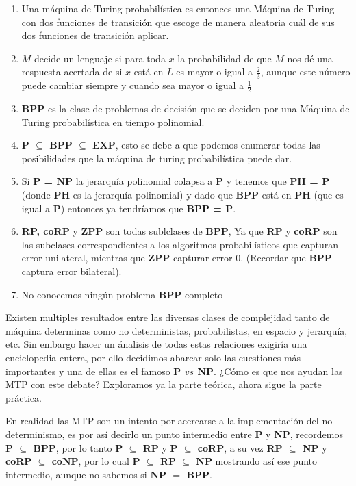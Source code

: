 \documentclass[12pt,letterpaper]{article}
\begin{document}
\begin{enumerate}
 
\item Una máquina de Turing probabilística es entonces una Máquina de Turing con dos funciones de transición que escoge de manera aleatoria cuál de sus dos funciones de transición aplicar.

\item $M$ decide un lenguaje si para toda $x$ la probabilidad de que $M$ nos dé una respuesta acertada de si $x$ está en $L$ es mayor o igual a $\frac{2}{3}$, aunque este número puede cambiar siempre y cuando sea mayor o igual a $\frac{1}{2}$

\item \textbf{BPP} es la clase de problemas de decisión que se deciden por una Máquina de Turing probabilística en tiempo polinomial.

\item \textbf{P $\subseteq$ BPP $\subseteq$ EXP}, esto se debe a que podemos enumerar todas las posibilidades que la máquina de turing probabilística puede dar.

\item Si \textbf{P = NP} la jerarquía polinomial colapsa a \textbf{P} y tenemos que \textbf{PH = P} (donde \textbf{PH} es la jerarquía polinomial) y dado que \textbf{BPP} está en \textbf{PH} (que es igual a \textbf{P}) entonces ya tendríamos que \textbf{BPP = P}.

\item \textbf{RP, coRP} y \textbf{ZPP} son todas sublclases de \textbf{BPP}, Ya que \textbf{RP} y \textbf{coRP} son las subclases correspondientes a los algoritmos probabilísticos que capturan error unilateral, mientras que \textbf{ZPP} capturar error 0. (Recordar que \textbf{BPP} captura error bilateral).

\item No conocemos ningún problema \textbf{BPP}-completo
\end{enumerate}

Existen multiples resultados entre las diversas clases de complejidad tanto de máquina determinas como no deterministas, probabilistas, en espacio y jerarquía, etc. Sin embargo hacer un ánalisis de todas estas relaciones exigiría una enciclopedia entera, por ello decidimos abarcar solo las cuestiones más importantes y una de ellas es el famoso \textbf{P $vs$ NP}. ¿Cómo es que nos ayudan las MTP con este debate? Exploramos ya la parte teórica, ahora sigue la parte práctica.

En realidad las MTP son un intento por acercarse a la implementación del no determinismo, es por así decirlo un punto intermedio entre \textbf{P} y \textbf{NP}, recordemos \textbf{P $\subseteq$ BPP}, por lo tanto \textbf{P $\subseteq$ RP} y \textbf{P $\subseteq$ coRP}, a su vez \textbf{RP $\subseteq$ NP} y \textbf{coRP $\subseteq$ coNP}, por lo cual \textbf{P $\subseteq$ RP $\subseteq$ NP} mostrando así ese punto intermedio, aunque no sabemos si \textbf{NP $=$ BPP}.
\end{document}

